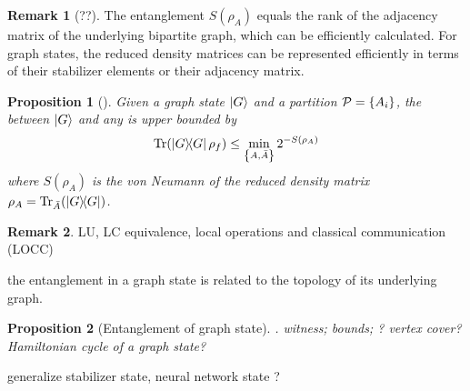 \documentclass[
10pt,
aps,
pra,
linenumbers,
floatfix,
]{revtex4-2}
\theoremstyle{plain}
\newtheorem{proposition}{Proposition}
\newtheorem{question}{Question}
\theoremstyle{definition}
\newtheorem{observation}{Observation}
\newtheorem{remark}{Remark}
\newtheorem{problem}{Problem}
\newcommand{\dm}{\rho}
\begin{document}

\begin{remark}[??]
	The entanglement  $S( \dm_A )$ equals the rank of the adjacency matrix of the underlying bipartite graph, which can be efficiently calculated.
	For graph states, the reduced density matrices can be represented efficiently in terms of their stabilizer elements or their adjacency matrix.
\end{remark}
\begin{proposition}[\cite{zhouDetectingMultipartiteEntanglement2019}]
	Given a graph state $\ket{G}$ and a partition $\mathcal{P}=\qty{A_i}$, the  between $\ket{G}$ and any  is upper bounded by
	\begin{equation}
		\Tr(\op{G} \dm_f) \le \min_{\qty{A,\bar{A}}} 2^{-S(\dm_A)}
	\end{equation}
	where $S(\dm_A)$ is the von Neumann  of the reduced density matrix $\dm_A=\Tr_{\bar{A}}(\op{G})$.
\end{proposition}
\begin{remark}
	LU, LC equivalence, local operations and classical communication (LOCC)
\end{remark}
the entanglement in a graph state is related to the topology of its underlying graph.
\begin{proposition}[Entanglement of graph state]
	\cite{heinEntanglementGraphStates2006}.
	witness; bounds; ? vertex cover?
	Hamiltonian cycle of a graph state? 
\end{proposition}
generalize \cite{zhangEfficientEntanglementGeneration2021}
stabilizer state, neural network state \cite{gaoEfficientRepresentationQuantum2017}?
\end{document}
